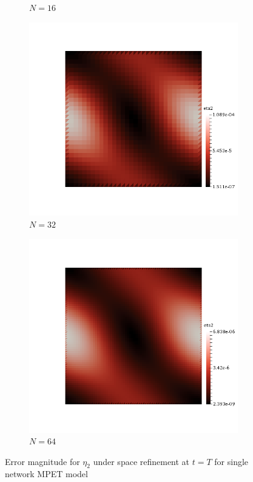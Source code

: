 \begin{figure}[h!]
\begin{subfigure}[b]{0.24\textwidth}
    \caption{$N=16$}
  \end{subfigure}
  \begin{subfigure}[b]{0.24\textwidth}
    \includegraphics[width=\textwidth,height=\textheight,keepaspectratio,height=\textheight,keepaspectratio]{figures/1_mpet/space/eta2_32.png}
    \caption{$N=32$}
  \end{subfigure}
  \begin{subfigure}[b]{0.24\textwidth}
    \includegraphics[width=\textwidth,height=\textheight,keepaspectratio,height=\textheight,keepaspectratio]{figures/1_mpet/space/eta2_64.png}
    \caption{$N=64$}
  \end{subfigure}
  \caption{Error magnitude for $\eta_2$ under space refinement at $t=T$ for single network MPET model} \label{fig:biot_eta2}
\end{figure}

